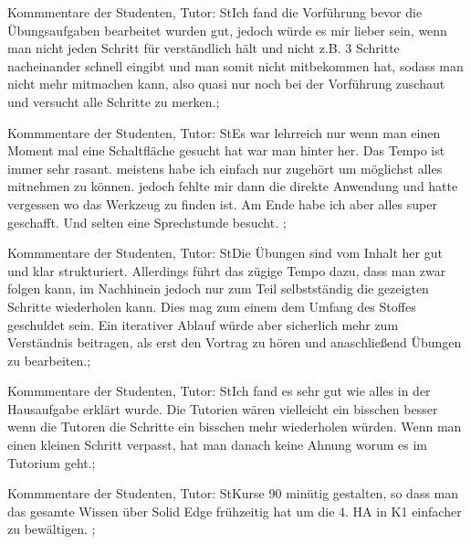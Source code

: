 \documentclass[10pt]{beamer}
\begin{document}
\begin{frame}[fragile]{Kommmentare der Studenten, Tutor: St}Ich fand die Vorführung bevor die Übungsaufgaben bearbeitet wurden gut, jedoch würde es mir lieber sein, wenn man nicht jeden Schritt für verständlich hält und nicht z.B. 3 Schritte nacheinander schnell eingibt und man somit nicht mitbekommen hat, sodass man nicht mehr mitmachen kann, also quasi nur noch bei der Vorführung zuschaut und versucht alle Schritte zu merken.;
 \end{frame}
\begin{frame}[fragile]{Kommmentare der Studenten, Tutor: St}Es war lehrreich nur wenn man einen Moment mal eine Schaltfläche gesucht hat war man hinter her. Das Tempo ist immer sehr rasant. meistens habe ich einfach nur zugehört um möglichst alles mitnehmen zu können. jedoch fehlte mir dann die direkte Anwendung und hatte vergessen wo das Werkzeug zu finden ist.
 Am Ende habe ich aber alles super geschafft. Und selten eine Sprechstunde besucht.
 ;
 \end{frame}
\begin{frame}[fragile]{Kommmentare der Studenten, Tutor: St}Die Übungen sind vom Inhalt her gut und klar strukturiert. Allerdings führt das zügige Tempo dazu, dass man zwar folgen kann, im Nachhinein jedoch nur zum Teil selbstständig die gezeigten Schritte wiederholen kann. Dies mag zum einem dem Umfang des Stoffes geschuldet sein. Ein iterativer Ablauf würde aber sicherlich mehr zum Verständnis beitragen, als erst den Vortrag zu hören und anaschließend Übungen zu bearbeiten.;
 \end{frame}
\begin{frame}[fragile]{Kommmentare der Studenten, Tutor: St}Ich fand es sehr gut wie alles in der Hausaufgabe erklärt wurde. Die Tutorien wären vielleicht ein bisschen besser wenn die Tutoren die Schritte ein bisschen mehr wiederholen würden. Wenn man einen kleinen Schritt verpasst, hat man danach keine Ahnung worum es im Tutorium geht.;
 \end{frame}
\begin{frame}[fragile]{Kommmentare der Studenten, Tutor: St}Kurse 90 minütig gestalten, so dass man das gesamte Wissen über Solid Edge frühzeitig hat um die 4. HA in K1 einfacher zu bewältigen.  ;
 \end{frame}
\end{document}
